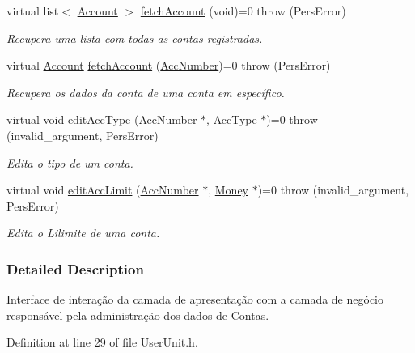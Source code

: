 \begin{DoxyCompactItemize}
virtual list$<$ \hyperlink{classAccount}{Account} $>$ \hyperlink{classUserAccAdm_aa84b9df92ad9e11b1d9c71e9350efdc7}{fetch\-Account} (void)=0  throw (\-Pers\-Error)
\begin{DoxyCompactList}\small\item\em Recupera uma lista com todas as contas registradas. \end{DoxyCompactList}\item 
virtual \hyperlink{classAccount}{Account} \hyperlink{classUserAccAdm_a5957dcbf58d30b171a6ca0967dacf2d9}{fetch\-Account} (\hyperlink{classAccNumber}{Acc\-Number})=0  throw (\-Pers\-Error)
\begin{DoxyCompactList}\small\item\em Recupera os dados da conta de uma conta em específico. \end{DoxyCompactList}\item 
virtual void \hyperlink{classUserAccAdm_a80d61347b448e3ae9bdca4e02e65bcd1}{edit\-Acc\-Type} (\hyperlink{classAccNumber}{Acc\-Number} $\ast$, \hyperlink{classUsrType}{Acc\-Type} $\ast$)=0  throw (invalid\-\_\-argument, Pers\-Error)
\begin{DoxyCompactList}\small\item\em Edita o tipo de um conta. \end{DoxyCompactList}\item 
virtual void \hyperlink{classUserAccAdm_a43f0bb580d63a9c782e8c83417562a17}{edit\-Acc\-Limit} (\hyperlink{classAccNumber}{Acc\-Number} $\ast$, \hyperlink{classMoney}{Money} $\ast$)=0  throw (invalid\-\_\-argument, Pers\-Error)
\begin{DoxyCompactList}\small\item\em Edita o Lilimite de uma conta. \end{DoxyCompactList}\end{DoxyCompactItemize}


\subsubsection{Detailed Description}
Interface de interação da camada de apresentação com a camada de negócio responsável pela administração dos dados de Contas. 

Definition at line 29 of file User\-Unit.\-h.



